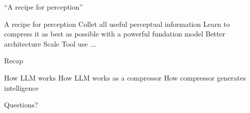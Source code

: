 \documentclass[scheme=plain]{ctexbeamer}
\begin{document}
\begin{frame}{``A recipe for perception''}
  \begin{outline}
    \0 A recipe for perception
      \1 Collet all useful perceptual information
      \1 Learn to compress it as best as possible with a powerful fundation model
        \2 Better architecture
        \2 Scale
        \2 Tool use
        \2 ...
  \end{outline}
\end{frame}


\begin{frame}{Recap}
  \begin{outline}
    \1 How LLM works
    \1 How LLM works as a compressor
    \1 How compressor generates intelligence
  \end{outline}
\end{frame}

\begin{frame}[standout]
  Questions?
\end{frame}
\end{document}
